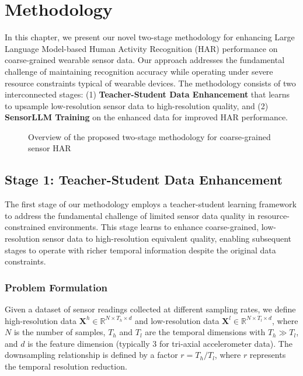 \chapter{Methodology}

\hspace{2em}In this chapter, we present our novel two-stage methodology for enhancing Large Language Model-based Human Activity Recognition (HAR) performance on coarse-grained wearable sensor data. Our approach addresses the fundamental challenge of maintaining recognition accuracy while operating under severe resource constraints typical of wearable devices. The methodology consists of two interconnected stages: (1) \textbf{Teacher-Student Data Enhancement} that learns to upsample low-resolution sensor data to high-resolution quality, and (2) \textbf{SensorLLM Training} on the enhanced data for improved HAR performance.

\begin{figure}
    \centering
    \caption{Overview of the proposed two-stage methodology for coarse-grained sensor HAR}
    \label{fig:methodology-overview}
\end{figure}

\section{Stage 1: Teacher-Student Data Enhancement}

\hspace{2em}The first stage of our methodology employs a teacher-student learning framework to address the fundamental challenge of limited sensor data quality in resource-constrained environments. This stage learns to enhance coarse-grained, low-resolution sensor data to high-resolution equivalent quality, enabling subsequent stages to operate with richer temporal information despite the original data constraints.

\subsection{Problem Formulation}

\hspace{2em}Given a dataset of sensor readings collected at different sampling rates, we define high-resolution data $\mathbf{X}^h \in \mathbb{R}^{N \times T_h \times d}$ and low-resolution data $\mathbf{X}^l \in \mathbb{R}^{N \times T_l \times d}$, where $N$ is the number of samples, $T_h$ and $T_l$ are the temporal dimensions with $T_h \gg T_l$, and $d$ is the feature dimension (typically 3 for tri-axial accelerometer data). The downsampling relationship is defined by a factor $r = T_h / T_l$, where $r$ represents the temporal resolution reduction.

